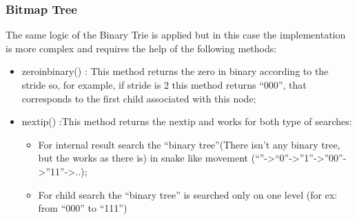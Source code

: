 \documentclass[]{report}
\begin{document}
\begin{minipage}{\linewidth}%

\label{fig:print_controller}
\end{minipage}

\subsubsection{Bitmap Tree}
The same logic of the Binary Trie is applied but in this case the implementation is more complex and requires the help of the following methods:
\begin{itemize}
\item zero\textunderscore in\textunderscore binary() : This method returns the zero in binary according to the stride so, for example, if stride is 2 this method returns “000”, that corresponds to the first child associated with this node;
\item next\textunderscore ip() :This method returns the next\textunderscore ip and works for both type of searches:
\begin{itemize}
\item For internal result search the “binary tree”(There isn’t any binary tree, but the works as there is) in snake like movement (“”->“0”->”1”->”00”->”11”->..);
\item For child search the “binary tree” is searched only on one level (for ex: from “000” to “111”)
\end{itemize}
\end{itemize}
\end{document}
